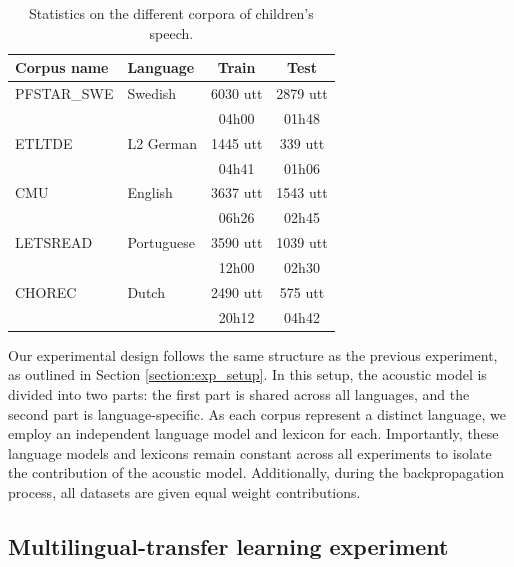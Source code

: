 \begin{table}[ht]
\begin{center}
\begin{tabular}{llcc}
\hline
Corpus name & Language     & Train & Test  \\ \hline
\multicolumn{1}{l}{PFSTAR\_SWE} & Swedish             & 6030 utt  & 2879 utt  \\ 
\multicolumn{1}{l}{} &              & 04h00 & 01h48 \\\hline
\multicolumn{1}{l}{ETLTDE}      & L2 German   & 1445 utt &  339 utt \\ 
\multicolumn{1}{l}{}      &    &  04h41 & 01h06 \\ \hline
\multicolumn{1}{l}{CMU}         & English             & 3637 utt & 1543 utt \\ 
\multicolumn{1}{l}{}         &              & 06h26 & 02h45  \\ \hline
\multicolumn{1}{l}{LETSREAD}    & Portuguese & 3590 utt & 1039 utt \\ 
\multicolumn{1}{l}{}    &  & 12h00 & 02h30 \\  \hline
\multicolumn{1}{l}{CHOREC}      & Dutch               & 2490 utt & 575 utt  \\ 
\multicolumn{1}{l}{}      &                &  20h12 & 04h42 \\ \hline
\end{tabular}
\caption{Statistics on the different corpora of children's speech.}
\label{tab:statistics2}
\end{center}
\end{table}


Our experimental design follows the same structure as the previous experiment, as outlined in Section \ref{section:exp_setup}. In this setup, the acoustic model is divided into two parts: the first part is shared across all languages, and the second part is language-specific. As each corpus represent a distinct language, we employ an independent language model and lexicon for each. Importantly, these language models and lexicons remain constant across all experiments to isolate the contribution of the acoustic model. Additionally, during the backpropagation process, all datasets are given equal weight contributions. 

\subsection{Multilingual-transfer learning experiment}

